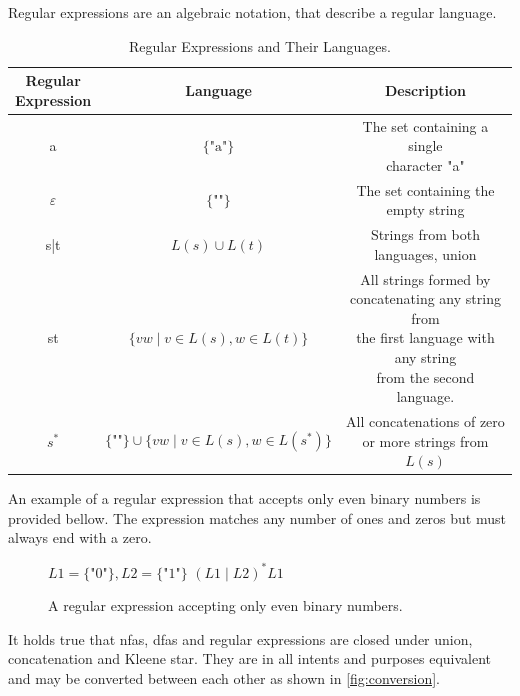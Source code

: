 \begin{definition}\label{def:regular_exp}
  Regular expressions are an algebraic notation, that describe a regular language. 
  
\begin{table}[ht]
\centering
\begin{tabular}{|ccc|}
\hline
\makecell{\textbf{Regular}\\ \textbf{Expression}} & \textbf{Language} & \textbf{Description} \\ 
\hline
a                          & $\{\text{"a"}\}$          & \makecell{The set containing a single\\ character "a"} \\
\hline
$\varepsilon$                  & $\{\text{""}\}$           & The set containing the empty string \\
\hline
s|t                         & $L(s) \cup L(t)$            & Strings from both languages, union \\
\hline
st                          & $\{vw \mid v \in L(s), w \in L(t)\}$ & \makecell{All strings formed by\\ concatenating any string from\\ the first language with any string\\ from the second language.} \\
\hline
$s^*$                         & $\{\text{""}\} \cup \{vw \mid v \in L(s), w \in L(s^*)\}$ & \makecell{All concatenations of zero \\ or more strings from $L(s)$} \\
\hline
\end{tabular}
\caption{Regular Expressions and Their Languages.}
\label{tab:regex}
\end{table}
\end{definition}

An example of a regular expression that accepts only even binary numbers is provided bellow. The expression matches any number of ones and zeros but must always end with a zero.

\begin{figure}[H]\label{fig:regex}
  \centering
  $L1=\{\text{"}0\text{"}\}, L2=\{\text{"}1\text{"}\}$ $(L1\mid L2)^* L1$
  \caption{A regular expression accepting only even binary numbers.}
\end{figure}

It holds true that \glspl{nfa}, \glspl{dfa} and regular expressions are closed under union, concatenation and Kleene star. They are in all intents and purposes equivalent and may be converted between each other as shown in \cref{fig:conversion}.

